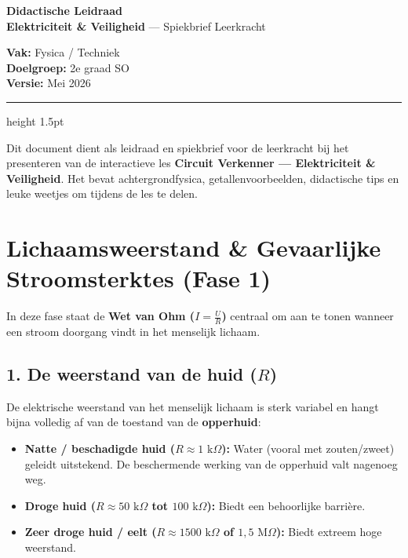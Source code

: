\documentclass[a4paper, 11pt]{article}
\begin{document}
\noindent
\begin{minipage}[b]{0.3\textwidth}
\end{minipage}
\begin{minipage}[b]{0.45\textwidth}
    \centering
    {\LARGE \textbf{Didactische Leidraad}} \\[0.15cm]
    {\small \textbf{Elektriciteit \& Veiligheid} --- Spiekbrief Leerkracht}
\end{minipage}
\begin{minipage}[b]{0.25\textwidth}
    \flushright
    \small
    \textbf{Vak:} Fysica / Techniek \\
    \textbf{Doelgroep:} 2e graad SO \\
    \textbf{Versie:} Mei 2026
\end{minipage}

\vspace{0.3cm}
\hrule height 1.5pt
\vspace{0.5cm}

\noindent Dit document dient als leidraad en spiekbrief voor de leerkracht bij het presenteren van de interactieve les \textbf{Circuit Verkenner --- Elektriciteit \& Veiligheid}. Het bevat achtergrondfysica, getallenvoorbeelden, didactische tips en leuke weetjes om tijdens de les te delen.

\section{Lichaamsweerstand \& Gevaarlijke Stroomsterktes (Fase 1)}
In deze fase staat de \textbf{Wet van Ohm ($I = \frac{U}{R}$)} centraal om aan te tonen wanneer een stroom doorgang vindt in het menselijk lichaam.

\subsection{1. De weerstand van de huid ($R$)}
De elektrische weerstand van het menselijk lichaam is sterk variabel en hangt bijna volledig af van de toestand van de \textbf{opperhuid}:
\begin{itemize}
    \item \textbf{Natte / beschadigde huid ($R \approx 1\text{ k}\Omega$):} Water (vooral met zouten/zweet) geleidt uitstekend. De beschermende werking van de opperhuid valt nagenoeg weg.
    \item \textbf{Droge huid ($R \approx 50\text{ k}\Omega$ tot $100\text{ k}\Omega$):} Biedt een behoorlijke barrière.
    \item \textbf{Zeer droge huid / eelt ($R \approx 1500\text{ k}\Omega$ of $1,5\text{ M}\Omega$):} Biedt extreem hoge weerstand.
\end{itemize}
\end{document}
